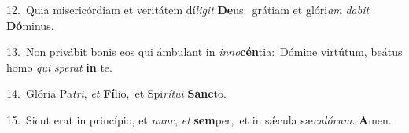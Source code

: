 {\numbfont\textcolor{\numbcolor}{12.}}~Quia misericórdiam et veritátem dí\-\textit{li}\-\textit{git} \textbf{De}\-us:~\star grátiam et glóri\textit{am} \textit{da}\-\textit{bit} \textbf{Dó}\-minus.\par
{\numbfont\textcolor{\numbcolor}{13.}}~Non privábit bonis eos qui ámbulant in \textit{in}\-\textit{no}\textbf{cén}tia:~\star Dómine virtútum, beátus homo \textit{qui} \textit{spe}\-\textit{rat} \textbf{in} te.\par
{\numbfont\textcolor{\numbcolor}{14.}}~Glória Pa\-\textit{tri}\-, \textit{et} \textbf{Fí}\-lio,~\star et Spi\-\textit{rí}\-\textit{tu}\textit{i} \textbf{Sanc}\-to.\par
{\numbfont\textcolor{\numbcolor}{15.}}~Sicut erat in princípio, et \textit{nunc}\-, \textit{et} \textbf{sem}\-per,~\star et in sǽcula sæ\-\textit{cu}\-\textit{ló}\textit{rum}. \textbf{A}\-men.\par
